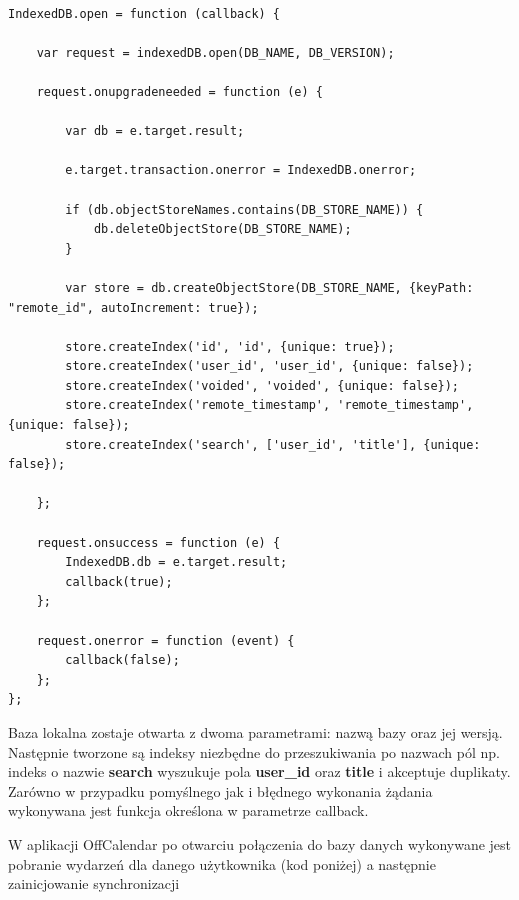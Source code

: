 \begin{lstlisting}[caption=Otwarcie połączenia z lokalną bazą danych., label=amb, captionpos=b]

IndexedDB.open = function (callback) {

    var request = indexedDB.open(DB_NAME, DB_VERSION);

    request.onupgradeneeded = function (e) {

        var db = e.target.result;

        e.target.transaction.onerror = IndexedDB.onerror;

        if (db.objectStoreNames.contains(DB_STORE_NAME)) {
            db.deleteObjectStore(DB_STORE_NAME);
        }

        var store = db.createObjectStore(DB_STORE_NAME, {keyPath: "remote_id", autoIncrement: true});

        store.createIndex('id', 'id', {unique: true});
        store.createIndex('user_id', 'user_id', {unique: false});
        store.createIndex('voided', 'voided', {unique: false});
        store.createIndex('remote_timestamp', 'remote_timestamp', {unique: false});
        store.createIndex('search', ['user_id', 'title'], {unique: false});

    };

    request.onsuccess = function (e) {
        IndexedDB.db = e.target.result;
        callback(true);
    };

    request.onerror = function (event) {
        callback(false);
    };
};

\end{lstlisting}

Baza lokalna zostaje otwarta z dwoma parametrami: nazwą bazy oraz jej wersją. Następnie tworzone są indeksy niezbędne do przeszukiwania po nazwach pól np. indeks o nazwie \textbf{search} wyszukuje pola \textbf{user\_id} oraz \textbf{title} i akceptuje duplikaty. Zarówno w przypadku pomyślnego jak i błędnego wykonania żądania wykonywana jest funkcja określona w parametrze callback. 

W aplikacji OffCalendar po otwarciu połączenia do bazy danych wykonywane jest pobranie wydarzeń dla danego użytkownika (kod poniżej) a następnie zainicjowanie synchronizacji

